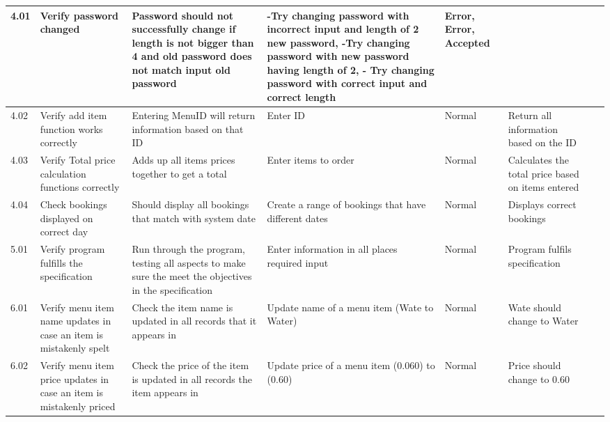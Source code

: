 \begin{landscape}
\begin{center}
\begin{longtable}{|p{1.5cm}|p{2.5cm}|p{2.5cm}|p{2cm}|p{2cm}|p{2cm}|p{2cm}|p{2cm}|}
        4.01 & Verify password changed & Password should not successfully change if length is not bigger than 4 and old password does not match input old password   & -Try changing password with incorrect input and length of 2 new password, -Try changing password with new password having length of 2, - Try changing password with correct input and correct length&Error, Error, Accepted  & & \\ \hline
        4.02 & Verify add item function works correctly & Entering MenuID will return information based on that ID & Enter ID &  Normal & Return all information based on the ID  & & \\ \hline
        4.03 & Verify Total price calculation functions correctly & Adds up all items prices together to get a total & Enter items to order &  Normal & Calculates the total price based on items entered  & & \\ \hline
	4.04 & Check bookings displayed on correct day & Should display all bookings that match with system date & Create a range of bookings that have different dates & Normal& Displays correct bookings & & \\ \hline
         5.01 & Verify program fulfills the specification & Run through the program, testing all aspects to make sure the meet the objectives in the specification & Enter information in all places required input &  Normal & Program fulfils specification  & & \\ \hline
	6.01 & Verify menu item name updates in case an item is mistakenly spelt & Check  the item name is updated in all records that it appears in & Update name of a menu item (Wate to Water) & Normal & Wate should change to Water & & \\ \hline
	6.02 & Verify menu item price updates in case an item is mistakenly priced & Check the price of the item is updated in all records the item appears in & Update price of a menu item (0.060) to (0.60) & Normal & Price should change to 0.60 & & \\ \hline
	






    \end{longtable}
\end{center}
\end{landscape}
